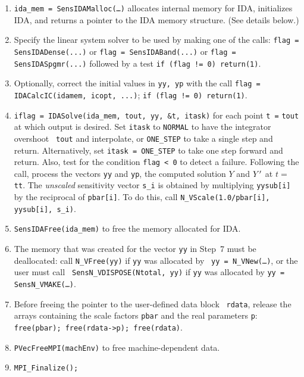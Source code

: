 \begin{enumerate}
\item 
{\tt ida\_mem = SensIDAMalloc(\ldots)} allocates internal
memory for IDA, initializes IDA, and returns a pointer to the
IDA memory structure. 
(See details below.)

\item Specify the linear system solver to be used by making one of the
calls: \newline 
{\tt flag = SensIDADense(...)} or {\tt flag = SensIDABand(...)} or
\newline
{\tt flag = SensIDASpgmr(...)}
followed by a test {\tt if (flag != 0) return(1)}.

\item Optionally, correct the initial values in {\tt yy, yp} with 
the call \newline
{\tt flag = IDACalcIC(idamem, icopt, ...)}; {\tt if (flag != 0) return(1)}.

\item 
{\tt iflag = IDASolve(ida\_mem, tout, yy, \&t, itask)} for each point
{\tt t =} {\tt tout} at which output is desired.
Set {\tt itask} to {\tt NORMAL} to have the integrator overshoot {\tt
tout} and interpolate, or {\tt ONE\_STEP} to take a single step and
return.
Alternatively, set {\tt itask = ONE\_STEP} to take one step forward
and return.
Also, test for the condition {\tt flag < 0} to detect a failure.
Following the call, process the vectors {\tt yy} and 
{\tt yp}, the computed solution $Y$ and $Y^{\prime}$ at $t = $ {\tt tt}.
The {\em unscaled} sensitivity vector {\tt s\_i} is obtained by multiplying
{\tt yysub[i]} by the reciprocal of {\tt pbar[i]}.
To do this, call {\tt N\_VScale(1.0/pbar[i], yysub[i], s\_i)}.

\item 
{\tt SensIDAFree(ida\_mem)} to free the memory allocated for IDA.

\item 
The memory that was created for the vector {\tt yy} in Step~7 must be
deallocated: call {\tt N\_VFree(yy)} if {\tt yy} was allocated by {\tt
yy = N\_VNew(\ldots)}, or the user must call {\tt
SensN\_VDISPOSE(Ntotal, yy)} if {\tt yy} was allocated by {\tt yy =
SensN\_VMAKE(\ldots)}.

\item
Before freeing the pointer to the user-defined data block {\tt
rdata}, release the arrays containing the scale factors {\tt pbar}
and the real parameters {\tt p}:
{\tt free(pbar); free(rdata->p); free(rdata)}.

\item 
{\tt PVecFreeMPI(machEnv)} to free machine-dependent data.

\item
{\tt MPI\_Finalize();}
\end{enumerate}

